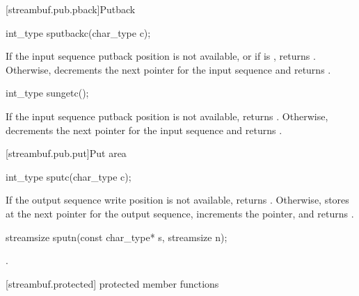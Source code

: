 [streambuf.pub.pback]{Putback}

%
\begin{itemdecl}
int_type sputbackc(char_type c);
\end{itemdecl}

\begin{itemdescr}
\pnum
\returns
If the input sequence putback position is not available, or
if
is , returns
.
Otherwise, decrements the next pointer for the input sequence and
returns
.
\end{itemdescr}

%
\begin{itemdecl}
int_type sungetc();
\end{itemdecl}

\begin{itemdescr}
\pnum
\returns
If the input sequence putback position is not available,
returns
.
Otherwise, decrements the next pointer for the input sequence and
returns
.
\end{itemdescr}

[streambuf.pub.put]{Put area}

%
\begin{itemdecl}
int_type sputc(char_type c);
\end{itemdecl}

\begin{itemdescr}
\pnum
\returns
If the output sequence write position is not available,
returns
.
Otherwise, stores  at the next pointer for the output sequence,
increments the pointer, and
returns
.
\end{itemdescr}

%
\begin{itemdecl}
streamsize sputn(const char_type* s, streamsize n);
\end{itemdecl}

\begin{itemdescr}
\pnum
\returns
{}.
\end{itemdescr}

[streambuf.protected]{ protected member functions}

